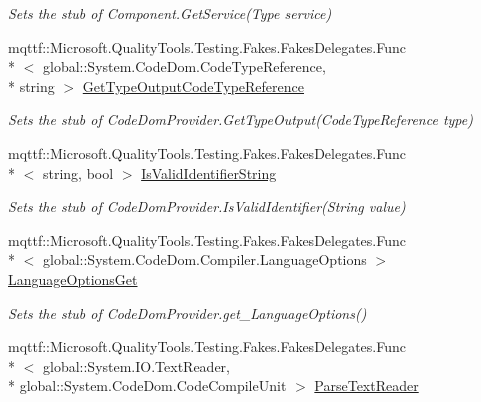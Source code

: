 \begin{DoxyCompactItemize}
\begin{DoxyCompactList}\small\item\em Sets the stub of Component.\-Get\-Service(\-Type service)\end{DoxyCompactList}\item 
mqttf\-::\-Microsoft.\-Quality\-Tools.\-Testing.\-Fakes.\-Fakes\-Delegates.\-Func\\*
$<$ global\-::\-System.\-Code\-Dom.\-Code\-Type\-Reference, \\*
string $>$ \hyperlink{class_system_1_1_code_dom_1_1_compiler_1_1_fakes_1_1_stub_code_dom_provider_a49dee1ac7eb49679f95fb24c7211ed04}{Get\-Type\-Output\-Code\-Type\-Reference}
\begin{DoxyCompactList}\small\item\em Sets the stub of Code\-Dom\-Provider.\-Get\-Type\-Output(\-Code\-Type\-Reference type)\end{DoxyCompactList}\item 
mqttf\-::\-Microsoft.\-Quality\-Tools.\-Testing.\-Fakes.\-Fakes\-Delegates.\-Func\\*
$<$ string, bool $>$ \hyperlink{class_system_1_1_code_dom_1_1_compiler_1_1_fakes_1_1_stub_code_dom_provider_a56866b1e6496739a3a03e1180ec73b42}{Is\-Valid\-Identifier\-String}
\begin{DoxyCompactList}\small\item\em Sets the stub of Code\-Dom\-Provider.\-Is\-Valid\-Identifier(\-String value)\end{DoxyCompactList}\item 
mqttf\-::\-Microsoft.\-Quality\-Tools.\-Testing.\-Fakes.\-Fakes\-Delegates.\-Func\\*
$<$ global\-::\-System.\-Code\-Dom.\-Compiler.\-Language\-Options $>$ \hyperlink{class_system_1_1_code_dom_1_1_compiler_1_1_fakes_1_1_stub_code_dom_provider_a2cfd6ecb6f692f37760bd3f7b02d6b7d}{Language\-Options\-Get}
\begin{DoxyCompactList}\small\item\em Sets the stub of Code\-Dom\-Provider.\-get\-\_\-\-Language\-Options()\end{DoxyCompactList}\item 
mqttf\-::\-Microsoft.\-Quality\-Tools.\-Testing.\-Fakes.\-Fakes\-Delegates.\-Func\\*
$<$ global\-::\-System.\-I\-O.\-Text\-Reader, \\*
global\-::\-System.\-Code\-Dom.\-Code\-Compile\-Unit $>$ \hyperlink{class_system_1_1_code_dom_1_1_compiler_1_1_fakes_1_1_stub_code_dom_provider_a040e9aa13ba9cc97ff7b5655461c6da1}{Parse\-Text\-Reader}

\end{DoxyCompactItemize}

